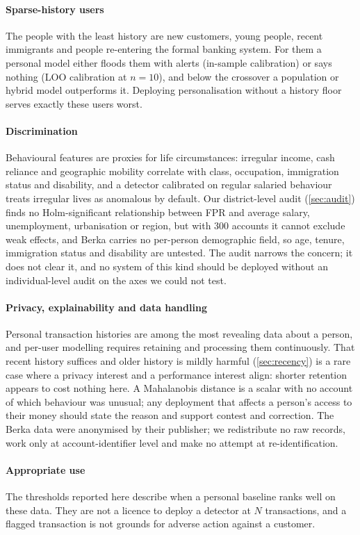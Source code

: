 \paragraph{Sparse-history users}
The people with the least history are new customers, young people, recent immigrants and people re-entering the formal banking system. For them a personal model either floods them with alerts (in-sample calibration) or says nothing (LOO calibration at $n=10$), and below the crossover a population or hybrid model outperforms it. Deploying personalisation without a history floor serves exactly these users worst.

\paragraph{Discrimination}
Behavioural features are proxies for life circumstances: irregular income, cash reliance and geographic mobility correlate with class, occupation, immigration status and disability, and a detector calibrated on regular salaried behaviour treats irregular lives as anomalous by default. Our district-level audit (\cref{sec:audit}) finds no Holm-significant relationship between FPR and average salary, unemployment, urbanisation or region, but with 300 accounts it cannot exclude weak effects, and Berka carries no per-person demographic field, so age, tenure, immigration status and disability are untested. The audit narrows the concern; it does not clear it, and no system of this kind should be deployed without an individual-level audit on the axes we could not test.

\paragraph{Privacy, explainability and data handling}
Personal transaction histories are among the most revealing data about a person, and per-user modelling requires retaining and processing them continuously. That recent history suffices and older history is mildly harmful (\cref{sec:recency}) is a rare case where a privacy interest and a performance interest align: shorter retention appears to cost nothing here. A Mahalanobis distance is a scalar with no account of which behaviour was unusual; any deployment that affects a person's access to their money should state the reason and support contest and correction. The Berka data were anonymised by their publisher; we redistribute no raw records, work only at account-identifier level and make no attempt at re-identification.

\paragraph{Appropriate use}
The thresholds reported here describe when a personal baseline ranks well on these data. They are not a licence to deploy a detector at $N$ transactions, and a flagged transaction is not grounds for adverse action against a customer.
